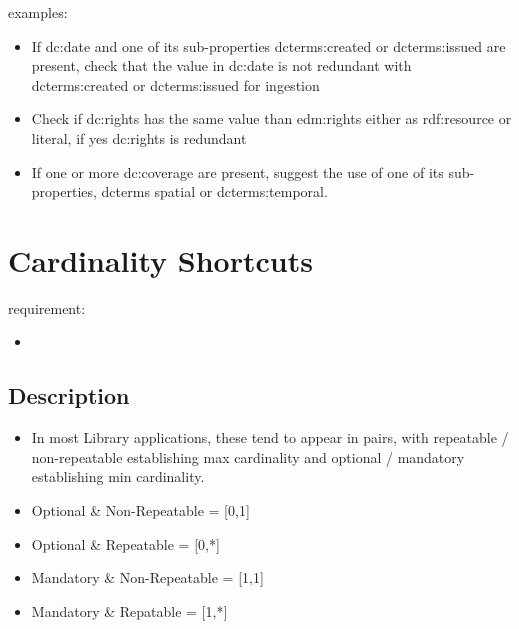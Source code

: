 \documentclass{llncs}
\begin{document}
examples:

\begin{itemize}
	\item If dc:date and one of its sub-properties dcterms:created or dcterms:issued are present, check that the value in dc:date is not redundant with dcterms:created or dcterms:issued for ingestion
  \item Check if dc:rights has the same value than edm:rights either as rdf:resource or literal, if yes dc:rights is redundant
  \item If one or more dc:coverage are present, suggest the use of one of its sub-properties, dcterms spatial or dcterms:temporal.
\end{itemize}

\section{Cardinality Shortcuts}

requirement:

\begin{itemize}
	\item 
\end{itemize}

\subsection{Description}

\begin{itemize}
  \item In most Library applications, these tend to appear in pairs, with repeatable / non-repeatable establishing max cardinality and optional / mandatory establishing min cardinality.
	\item Optional \& Non-Repeatable = [0,1]
  \item Optional \& Repeatable = [0,*]
  \item Mandatory \& Non-Repeatable = [1,1]
  \item Mandatory \& Repatable = [1,*]
\end{itemize}
\end{document}
